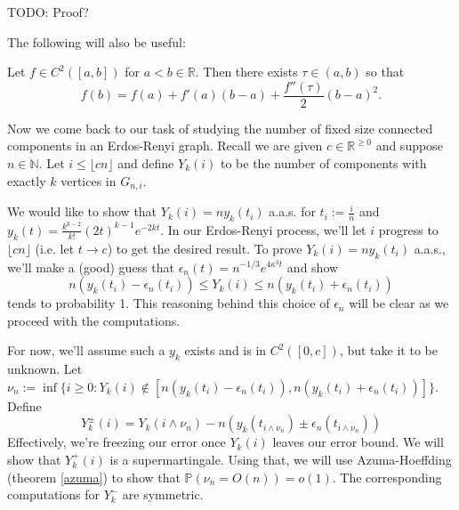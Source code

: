 TODO: Proof?

The following will also be useful:

\begin{theorem}
    \label{taylor}
    Let \(f \in C^{2}([a, b])\) for \(a < b \in \mathbb{R}\). Then there exists \(\tau \in (a, b)\) so that
    \[f(b) = f(a) + f'(a)(b-a) + \frac{f''(\tau)}{2}(b-a)^{2}.\]
\end{theorem}

Now we come back to our task of studying the number of fixed size connected components in an Erdos-Renyi graph. Recall we are given \(c \in
\mathbb{R}^{\geq 0}\) and suppose \(n \in \mathbb{N}\). Let \(i \leq \lfloor {cn} \rfloor\) and define \(Y_{k}(i)\) to be the number of components with exactly \(k\) vertices in \(G_{n, i}\).

We would like to show that \(Y_{k}(i) = n y_{k}(t_{i})\) a.a.s. for \(t_{i} := \frac{i}{n}\) and \(y_{k}(t) = \frac{k^{k-2}}{k!}(2t)^{k-1} e^{-2kt}\). In our Erdos-Renyi process, we'll let \(i\) progress to \(\lfloor {cn} \rfloor\) (i.e. let \(t \to c\)) to get the desired result. To prove \(Y_{k}(i) = n y_{k}(t_{i})\) a.a.s., we'll make a (good) guess that \(\epsilon_{n}(t) = n^{-1/3} e^{4 \kappa^{3} t}\) and show
\[n(y_{k}(t_{i}) - \epsilon_{n}(t_{i})) \leq Y_{k}(i) \leq n(y_{k}(t_{i}) + \epsilon_{n}(t_{i}))\]
tends to probability 1. This reasoning behind this choice of \(\epsilon_{n}\) will be clear as we proceed with the computations.

For now, we'll assume such a \(y_{k}\) exists and is in \(C^{2}([0, c])\), but take it to be unknown. Let \(\nu_{n} := \inf\limits \{i \geq 0 : Y_{k}(i) \not\in [n(y_{k}(t_{i}) - \epsilon_{n}(t_{i})), n(y_{k}(t_{i}) + \epsilon_{n}(t_{i}))]\}\). Define
\[Y_{k}^{\pm}(i) = Y_{k}(i \wedge \nu_{n}) - n(y_{k}(t_{i \wedge \nu_{n}}) \pm \epsilon_{n}(t_{i \wedge \nu_{n}})) \]
Effectively, we're freezing our error once \(Y_{k}(i)\) leaves our error bound. We will show that \(Y_{k}^{+}(i)\) is a supermartingale. Using that, we will use Azuma-Hoeffding (theorem \ref{azuma}) to show that \(\mathbb{P}(\nu_{n} = O(n)) = o(1)\). The corresponding computations for \(Y_{k}^{-}\) are symmetric.

